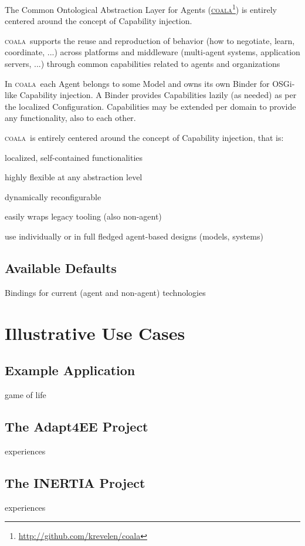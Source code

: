 \documentclass{aamas2015}
\renewcommand{\htmladdnormallinkfoot}[2]{\href{#2}{#1}\footnote{\url{#2}}}
\newcommand{\COALA}{\textsc{coala}}
\begin{document}
The Common Ontological Abstraction Layer for Agents
(\htmladdnormallinkfoot{\COALA}{http://github.com/krevelen/coala}) is entirely
centered around the concept of Capability injection.

\COALA\ supports the reuse and
reproduction of behavior (how to negotiate, learn, coordinate, ...) across platforms and middleware (multi-agent systems, application servers, ...) through
common capabilities related to agents and organizations

In \COALA\ each Agent belongs to some Model and owns its own Binder for
OSGi-like Capability injection.
A Binder provides Capabilities lazily (as needed) as per the localized Configuration. 
Capabilities may be extended per domain to provide any functionality, also to each other. 

\COALA\ is entirely centered around the concept of Capability injection, that
is:

localized, self-contained functionalities 

highly flexible at any abstraction level

dynamically reconfigurable

easily wraps legacy tooling (also non-agent)

use individually or in full fledged agent-based designs (models, systems)

\subsection{Available Defaults}
Bindings for current (agent and non-agent) technologies

\section{Illustrative Use Cases}
\label{sec:application}

\subsection{Example Application}
game of life

\subsection{The Adapt4EE Project}
experiences

\subsection{The INERTIA Project}
experiences
\end{document}

